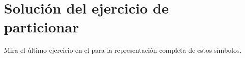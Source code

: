 \chapter{Solución del ejercicio de particionar}\label{s:chunking}

Mira el último ejercicio en el  para la representación completa de estos símbolos.

